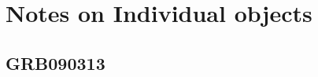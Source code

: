\documentclass[iop, twocolappendix, numberedappendix, tighten, appendixfloats]{emulateapj}
\begin{document}
	\def\aj{AJ}
	\def\araa{ARA\&A}
	\def\apj{ApJ}
	\def\apjl{ApJL}
	\def\apjs{ApJS}
	\def\apss{Ap\&SS}
	\def\aap{A\&A}
	\def\aapr{A\&A~Rev.}
	\def\aaps{A\&AS}
	\def\mnras{MNRAS}
	\def\nat{Nature}
	\def\pasp{PASP}
	\def\aplett{Astrophys.~Lett.}
	
	
	
	
	
	\newpage
	\appendix
	\section{Notes on Individual objects}
	
	\subsection{GRB090313}
	
	
	
\end{document}
